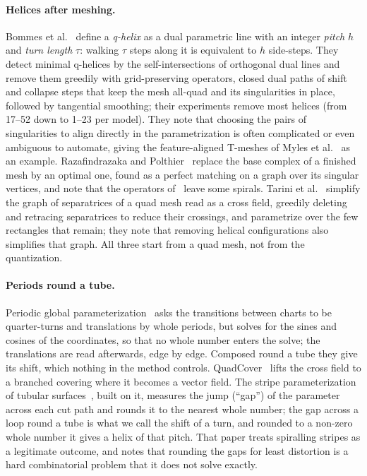 \documentclass[11pt,a4paper]{article}
\begin{document}
\paragraph{Helices after meshing.}
Bommes et al.~\cite{bommes2011structure} define a \emph{q-helix} as a dual
parametric line with an integer \emph{pitch} $h$ and \emph{turn length}
$\tau$: walking $\tau$ steps along it is equivalent to $h$ side-steps. They
detect minimal q-helices by the self-intersections of orthogonal dual lines
and remove them greedily with grid-preserving operators, closed dual paths of
shift and collapse steps that keep the mesh all-quad and its singularities in
place, followed by tangential smoothing; their experiments remove most
helices (from 17--52 down to 1--23 per model). They note that choosing the
pairs of singularities to align directly in the parametrization is often
complicated or even ambiguous to automate, giving the feature-aligned
T-meshes of Myles et al.~\cite{myles2010feature} as an example. Razafindrazaka and
Polthier~\cite{razafindrazaka2017optimal} replace the base complex of a
finished mesh by an optimal one, found as a perfect matching on a graph over
its singular vertices, and note that the operators
of~\cite{bommes2011structure} leave some spirals. Tarini et
al.~\cite{tarini2011simple} simplify the graph of separatrices of a quad mesh
read as a cross field, greedily deleting and retracing separatrices to reduce
their crossings, and parametrize over the few rectangles that remain; they
note that removing helical configurations also simplifies that graph. All
three start from a quad mesh, not from the quantization.

\paragraph{Periods round a tube.}
Periodic global parameterization~\cite{ray2006periodic} asks the transitions
between charts to be quarter-turns and translations by whole periods, but
solves for the sines and cosines of the coordinates, so that no whole number
enters the solve; the translations are read afterwards, edge by edge.
Composed round a tube they give its shift, which nothing in the method
controls. QuadCover~\cite{kalberer2007quadcover} lifts the cross field to a branched
covering where it becomes a vector field. The stripe parameterization of
tubular surfaces~\cite{kalberer2011stripe}, built on it, measures the jump
(``gap'') of the parameter across each cut path and rounds it to the nearest
whole number; the gap across a loop round a tube is what we call the shift of
a turn, and rounded to a non-zero whole number it gives a helix of that
pitch. That paper treats spiralling stripes as a legitimate outcome, and
notes that rounding the gaps for least distortion is a hard combinatorial
problem that it does not solve exactly.
\end{document}
